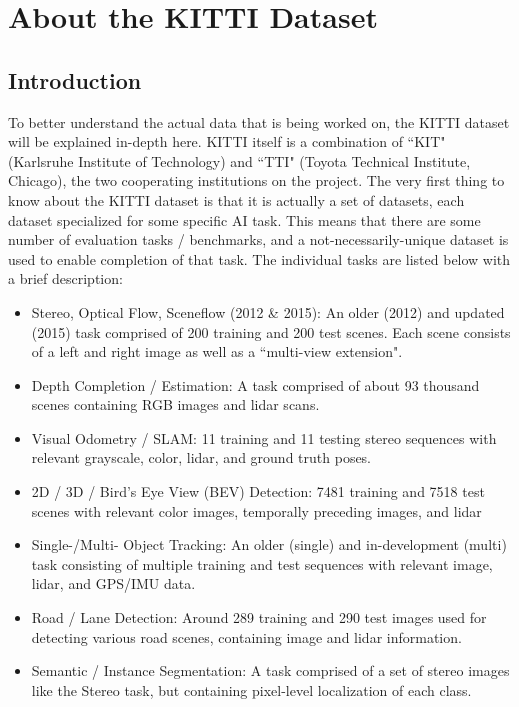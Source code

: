 \newpage
\section{About the KITTI Dataset}
\label{appendix_kitti}

\subsection{Introduction}
To better understand the actual data that is being worked on, the KITTI dataset will be explained in-depth here. KITTI itself is a combination of ``KIT" (Karlsruhe Institute of Technology) and ``TTI" (Toyota Technical Institute, Chicago), the two cooperating institutions on the project. The very first thing to know about the KITTI dataset is that it is actually a set of datasets, each dataset specialized for some specific AI task. This means that there are some number of evaluation tasks / benchmarks, and a not-necessarily-unique dataset is used to enable completion of that task. The individual tasks are listed below with a brief description:

\begin{itemize}\itemsep=-0.5em
    \item Stereo, Optical Flow, Sceneflow (2012 \& 2015): An older (2012) and updated (2015) task comprised of 200 training and 200 test scenes. Each scene consists of a left and right image as well as a ``multi-view extension".
    \item Depth Completion / Estimation: A task comprised of about 93 thousand scenes containing RGB images and lidar scans.
    \item Visual Odometry / SLAM: 11 training and 11 testing stereo sequences with relevant grayscale, color, lidar, and ground truth poses.
    \item 2D / 3D / Bird's Eye View (BEV) Detection: 7481 training and 7518 test scenes with relevant color images, temporally preceding images, and lidar
    \item Single-/Multi- Object Tracking: An older (single) and in-development (multi) task consisting of multiple training and test sequences with relevant image, lidar, and GPS/IMU data.
    \item Road / Lane Detection: Around 289 training and 290 test images used for detecting various road scenes, containing image and lidar information.
    \item Semantic / Instance Segmentation: A task comprised of a set of stereo images like the Stereo task, but containing pixel-level localization of each class.
\end{itemize}

